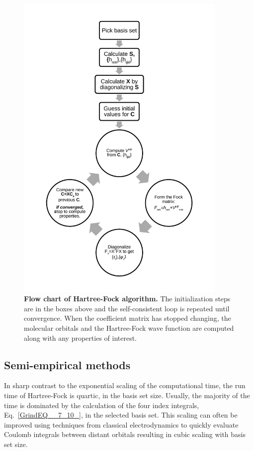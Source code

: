 \documentclass[11pt,oneside,final]{huthesis}%
\begin{document}
 \begin{figure}
	 \begin{center}
	\includegraphics[width=4in]{./figures/HF}
\end{center}
	 \caption{\textbf{Flow chart of Hartree-Fock algorithm.}  The initialization steps are in the boxes above and the self-consistent loop is repeated until convergence.  When the coefficient matrix has stopped changing, the molecular orbitals and the Hartree-Fock wave function are computed along with any properties of interest.}\label{fig:HF}
\end{figure}


\subsection{Semi-empirical methods}

 In sharp contrast to the exponential scaling of the computational time, the run time of Hartree-Fock is quartic, in the basis set size.  Usually, the majority of the time is dominated by the calculation of the four index integrals, Eq.~\eqref{GrindEQ__7_10_}, in the selected basis set.  This scaling can often be improved using techniques from classical electrodynamics to quickly evaluate Coulomb integrals between distant orbitals resulting in cubic scaling with basis set size.
\end{document}
